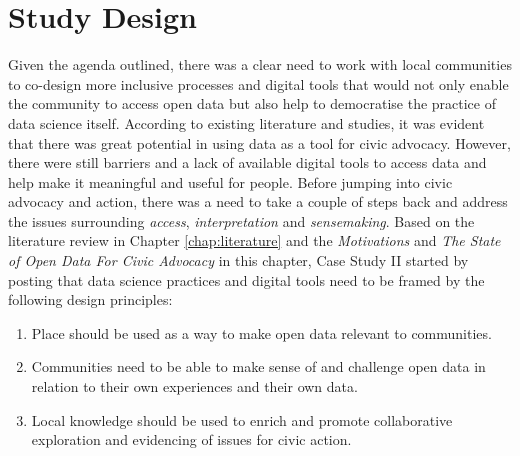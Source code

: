 \section{Study Design}
\label{sec:data_design}
Given the agenda outlined, there was a clear need to work with local communities to co-design more inclusive processes and digital tools that would not only enable the community to access open data but also help to democratise the practice of data science itself. According to existing literature and studies, it was evident that there was great potential in using data as a tool for civic advocacy. However, there were still barriers and a lack of available digital tools to access data and help make it meaningful and useful for people. Before jumping into civic advocacy and action, there was a need to take a couple of steps back and address the issues surrounding \textit{access}, \textit{interpretation} and \textit{sensemaking}. Based on the literature review in Chapter \ref{chap:literature} and the \textit{Motivations} and \textit{The State of Open Data For Civic Advocacy} in this chapter, Case Study II started by posting that data science practices and digital tools need to be framed by the following design principles:
\begin{enumerate}
    \item Place should be used as a way to make open data relevant to communities.
    \item Communities need to be able to make sense of and challenge open data in relation to their own experiences and their own data.
    \item Local knowledge should be used to enrich and promote collaborative exploration and evidencing of issues for civic action.
\end{enumerate}

